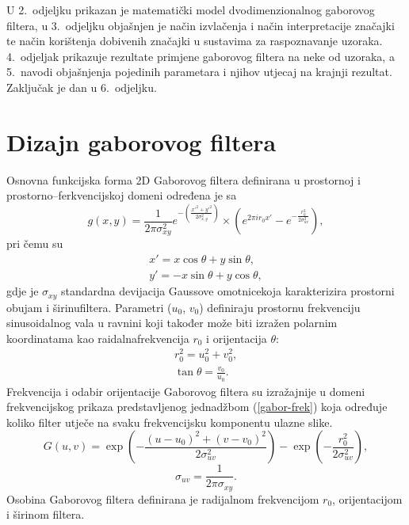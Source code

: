 \documentclass{article}
\begin{document}
U 2.~odjeljku prikazan je matematički model dvodimenzionalnog gaborovog filtera,
u 3.~odjeljku objašnjen je način izvlačenja i način interpretacije značajki te
način korištenja dobivenih značajki u sustavima za raspoznavanje uzoraka.
4.~odjeljak prikazuje rezultate primjene gaborovog filtera na neke od uzoraka, a
5.~navodi objašnjenja pojedinih parametara i njihov utjecaj na krajnji rezultat.
Zaključak je dan u 6.~odjeljku.

\section{Dizajn gaborovog filtera}
Osnovna funkcijska forma 2D Gaborovog filtera definirana u prostornoj i
prostorno--ferkvencijskoj domeni određena je sa \citep{huang2005robust}
\begin{equation}
g(x,y)=\frac{1}{2\pi \sigma^2_{xy}}e^{-\left ( \frac{x'^2 +
y'^2}{2\sigma^2_{x,y}} \right)} \times \left ( e^{2\pi i r_0 x'} -
e^{-\frac{r_0^2}{2\sigma^2_{uv}}}\right),
\label{2d-gabor}
\end{equation}
pri čemu su
\begin{eqnarray*}
x' = x \cos \theta + y \sin \theta, \\
y' = -x \sin \theta + y \cos \theta,
\end{eqnarray*}
gdje je $\sigma_{xy}$ standardna devijacija Gaussove omotnicekoja karakterizira prostorni obujam i
širinufiltera. Parametri ($u_0$,
$v_0$) definiraju prostornu frekvenciju sinusoidalnog vala u ravnini koji
također može biti izražen polarnim koordinatama kao raidalnafrekvencija $r_0$ i orijentacija $\theta$:
\begin{eqnarray}
r_0^2 = u_0^2 + v_0^2, \\
\tan \theta = \frac{v_0}{u_0}.
\end{eqnarray}
Frekvencija i odabir orijentacije Gaborovog filtera su izražajnije u domeni
frekvencijskog prikaza predstavljenog jednadžbom (\ref{gabor-frek}) koja
određuje koliko filter utječe na svaku frekvencijsku komponentu ulazne slike.
\begin{equation}
G(u,v) = \exp \left ( - \frac{(u-u_0)^2 + (v-v_0)^2}{2\sigma^2_{uv}}\right ) -
\exp \left ( - \frac{r_0^2}{2\sigma^2_{uv}} \right),
\label{gabor-frek}
\end{equation}
\begin{equation}
\sigma_{uv} = \frac{1}{2\pi \sigma_{xy}}.
\end{equation}
Osobina Gaborovog filtera definirana je radijalnom frekvencijom $r_0$,
orijentacijom i širinom filtera.
\end{document}
